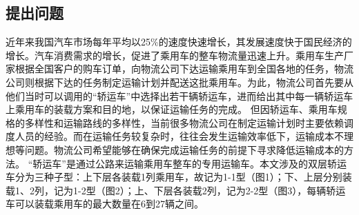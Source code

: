 \documentclass[UTF8]{ctexart}
\begin{document}
\subsection{提出问题}
	近年来我国汽车市场每年平均以25\%的速度快速增长，其发展速度快于国民经济的增长。汽车消费需求的增长，促进了乘用车的整车物流量迅速上升。乘用车生产厂家根据全国客户的购车订单，向物流公司下达运输乘用车到全国各地的任务，物流公司则根据下达的任务制定运输计划并配送这批乘用车。为此，物流公司首先要从他们当时可以调用的“轿运车”中选择出若干辆轿运车，进而给出其中每一辆轿运车上乘用车的装载方案和目的地，以保证运输任务的完成。
但因轿运车、乘用车规格的多样性和运输路线的多样性，当前很多物流公司在制定运输计划时主要依赖调度人员的经验。而在运输任务较复杂时，往往会发生运输效率低下，运输成本不理想等问题。物流公司希望能够在确保完成运输任务的前提下寻求降低运输成本的方法。
“轿运车”是通过公路来运输乘用车整车的专用运输车。本文涉及的双层轿运车分为三种子型：上下层各装载1列乘用车，故记为1-1型（图1）；下、上层分别装载1、2列，记为1-2型（图2）；上、下层各装载2列，记为2-2型（图3），每辆轿运车可以装载乘用车的最大数量在6到27辆之间。
\end{document}
